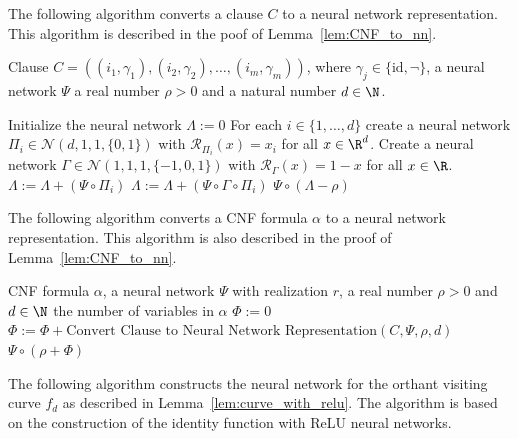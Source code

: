 \documentclass{amsart}[11pt]
\numberwithin{equation}{section}
\newcommand{\nn}{\mathcal{N}}
\newcommand{\realization}{\mathcal{R}}
\numberwithin{theorem}{section}
\begin{document}
The following algorithm converts a clause $C$ to a neural network representation. This algorithm is described in the poof of Lemma~\ref{lem:CNF_to_nn}.

\begin{algorithm}[H]
    \caption{Convert Clause to Neural Network Representation}\label{alg:clause_to_nn}
    \begin{algorithmic}[1]
    \REQUIRE Clause $C = \left((i_1, \gamma_1), (i_2, \gamma_2), \ldots, (i_m, \gamma_m)\right)$, where $\gamma_j \in \{\text{id}, \neg \}$, a neural network $\Psi$ a real number $\rho > 0$ and a natural number $d \in \N$.
    
    \STATE Initialize the neural network $\Lambda := 0$
    \STATE For each $i \in \{1, \ldots, d\}$ create a neural network $\Pi_i \in \nn(d, 1, 1, \{0, 1\})$ with $\realization_{\Pi_i}(x) = x_i$ for all $x \in \R^d$.
    \STATE Create a neural network $\Gamma \in \nn(1, 1, 1, \{-1, 0, 1\})$ with $\realization_{\Gamma}(x) = 1 - x$ for all $x \in \R$.
            \STATE $\Lambda := \Lambda + \left(\Psi \circ \Pi_i\right)$
        \ELSIF{$\gamma = \neg$}
            \STATE $\Lambda := \Lambda + \left(\Psi \circ \Gamma \circ \Pi_i\right)$
        \ENDIF
    \ENDFOR
    \RETURN $\Psi \circ (\Lambda - \rho)$
    
    \end{algorithmic}
\end{algorithm}

The following algorithm converts a CNF formula $\alpha$ to a neural network representation. This algorithm is also described in the proof of Lemma~\ref{lem:CNF_to_nn}.
    
\begin{algorithm}[H]
    \caption{Convert CNF Formula to Neural Network Representation} \label{alg:cnf_to_nn}
    \begin{algorithmic}[1]
    \REQUIRE CNF formula $\alpha$, a neural network $\Psi$ with realization $r$, a real number $\rho > 0$ and $d \in \N$ the number of variables in $\alpha$
    \STATE $\Phi := 0$
        \STATE $\Phi := \Phi + \text{Convert Clause to Neural Network Representation}(C, \Psi, \rho, d)$
    \ENDFOR
    \RETURN $\Psi \circ (\rho + \Phi)$
    \end{algorithmic}
\end{algorithm}

The following algorithm constructs the neural network for the orthant visiting curve $f_d$ as described in Lemma~\ref{lem:curve_with_relu}. The algorithm is based on the construction of the identity function with ReLU neural networks.
\end{document}
